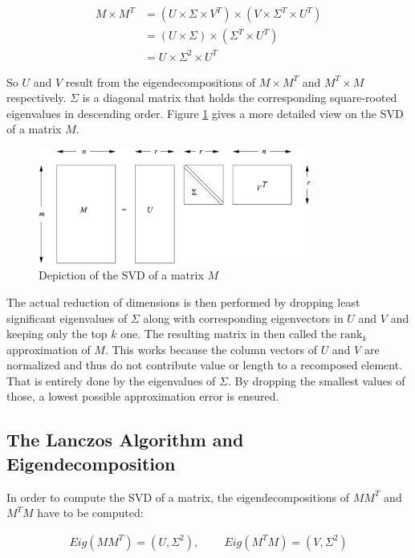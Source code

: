 \begin{align*}
M \times M^T 	& = (U \times \Sigma \times V^T) \times (V \times \Sigma^T \times
U^T) \\
					& = (U \times \Sigma) \times (\Sigma^T \times U^T) \\
					& = U \times \Sigma^2 \times U^T
\end{align*}

So $U$ and $V$ result from the eigendecompositions of $M\times M^T$ and $M^T\times M$ respectively. $\Sigma$ is a diagonal matrix that holds the corresponding square-rooted eigenvalues in descending order. Figure \ref{fig:svd} gives a more detailed view on the SVD of a matrix $M$. 

\begin{figure}[h]
	\centering
	\includegraphics[width=0.8\textwidth]{images/svd_mmds.png}
	\caption{Depiction of the SVD of a matrix $M$}
	\label{fig:svd}
\end{figure}

The actual reduction of dimensions is then performed by dropping least significant eigenvalues of $\Sigma$ along with corresponding eigenvectors in $U$ and $V$ and keeping only the top $k$ one. The resulting matrix in then called the $\text{rank}_k$ approximation of $M$. This works because the column vectors of $U$ and $V$ are normalized and thus do not contribute value or length to a recomposed element. That is entirely done by the eigenvalues of $\Sigma$. By dropping the smallest values of those, a lowest possible approximation error is ensured.

\subsection{The Lanczos Algorithm and Eigendecomposition}
\label{ssec:lanczos_algorithm}

In order to compute the SVD of a matrix, the eigendecompositions of $MM^T$ and $M^T M$ have to be computed:

\begin{align*}
	Eig(MM^T) = (U,\Sigma^2), \;	\;\;	\;\;	\;\;\;	Eig(M^T M) = (V,\Sigma^2)
\end{align*}

